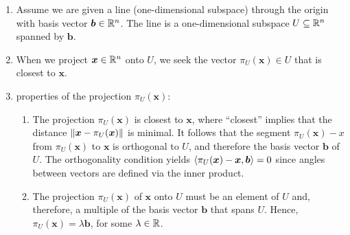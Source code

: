 \begin{enumerate}
    \item Assume we are given a line (one-dimensional subspace) through the origin with basis vector $\bm{b} \in \mathbb{R}^n$.
    The line is a one-dimensional subspace $U \subseteq \mathbb{R}^n$ spanned by $\bm{b}$. 
    \hfill \cite{mfml/book/mml/Deisenroth-Faisal-Ong}

    \item When we project $\bm{x} \in \mathbb{R}^n$ onto $U$, we seek the vector $\pi_U (\bm{x}) \in U$ that is closest to $\bm{x}$.
    \hfill \cite{mfml/book/mml/Deisenroth-Faisal-Ong}

    \item properties of the projection $\pi_U (\bm{x})$:
    \begin{enumerate}
        \item The projection $\pi _U (\bm{x})$ is closest to $\bm{x}$, where “closest” implies that the distance $\left\| \bm{x} - \pi _U (\bm{x}) \right\|$ is minimal. 
        It follows that the segment $\pi _U (\bm{x}) - x$ from $\pi _U (\bm{x})$ to $\bm{x}$ is orthogonal to $U$, and therefore the basis vector $\bm{b}$ of $U$. 
        The orthogonality condition yields $\langle\pi _U (\bm{x})  -  \bm{x}, \bm{b}\rangle = 0$ since angles between vectors are defined via the inner product.
        \hfill \cite{mfml/book/mml/Deisenroth-Faisal-Ong}

        \item The projection $\pi_U (\bm{x})$ of $\bm{x}$ onto $U$ must be an element of $U$ and, therefore, a multiple of the basis vector $\bm{b}$ that spans $U$. 
        Hence, $\pi_U (\bm{x}) = \lambda\bm{b}$, for some $\lambda \in \mathbb{R}$.
        \hfill \cite{mfml/book/mml/Deisenroth-Faisal-Ong}
    \end{enumerate}


\end{enumerate}
